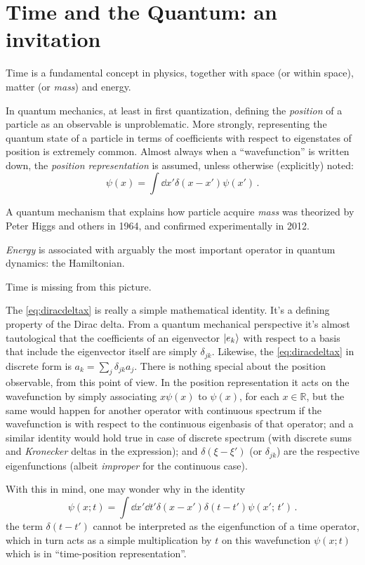 \section{Time and the Quantum: an invitation}

Time is a fundamental concept in physics, together with space (or  within space),
matter (or \emph{mass}) and energy.

In quantum mechanics, at least in first quantization, defining the \emph{position} of a particle as
an observable is unproblematic. More strongly, representing the quantum state of a particle
in terms of coefficients with respect to eigenstates of position is extremely common.
Almost always when a ``wavefunction'' is written down, the \emph{position representation}
is assumed, unless otherwise (explicitly) noted:
\begin{equation}\label{eq:diracdeltax}
  \psi(x) = \int \dd{x'} \delta(x-x') \psi(x') \,\text{.}
\end{equation}

A quantum mechanism that explains how particle acquire \emph{mass} was theorized by
Peter Higgs and others in 1964, and confirmed experimentally in 2012.

\emph{Energy} is associated with arguably the most important operator in quantum dynamics: the Hamiltonian.

Time is missing from this picture.

The \eqref{eq:diracdeltax} is really a simple mathematical identity.
It's a defining property of the Dirac delta.
From a quantum mechanical perspective it's almost tautological
that the coefficients of an eigenvector $\ket{e_k}$ with respect to a basis
that include the eigenvector itself are simply $\delta_{jk}$.
Likewise, the \eqref{eq:diracdeltax} in discrete form is $a_k = \sum_j \delta_{jk} a_j$.
There is nothing special about the position observable, from this point of view.
In the position representation it acts on the wavefunction by simply
associating $x\psi(x)$ to $\psi(x)$, for each $x \in \mathbb{R}$,
but the same would happen for another operator with continuous spectrum
if the wavefunction is with respect to the continuous eigenbasis
of that operator; and a similar identity
would hold true in case of discrete spectrum
(with discrete sums and \emph{Kronecker} deltas in the expression);
and $\delta(\xi-\xi')$ (or $\delta_{jk}$) are the respective
eigenfunctions (albeit \emph{improper} for the continuous case).

With this in mind, one may wonder why in the identity
\begin{equation}\label{eq:diracdeltax}
  \psi(x; t) = \int \dd{x'}\dd{t'} \delta(x-x')\delta(t-t') \psi(x';\, t') \,\text{.}
\end{equation}
the term $\delta(t-t')$ cannot be interpreted as the eigenfunction of a time operator,
which in turn acts as a simple multiplication by $t$ on this
wavefunction $\psi(x; t)$ which is in ``time-position representation''.
